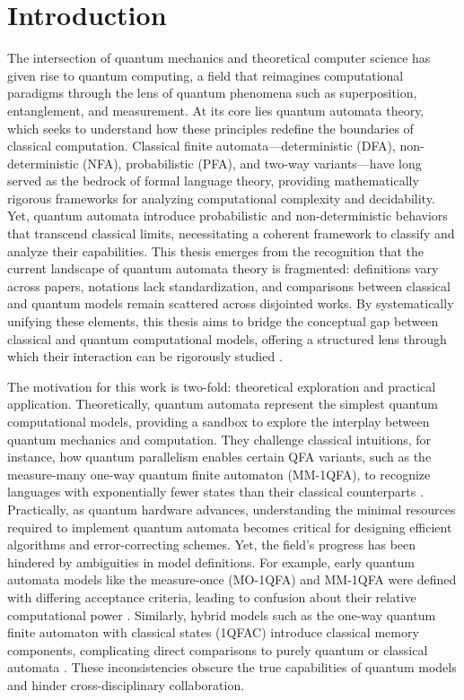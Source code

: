 \chapter{Introduction}  

The intersection of quantum mechanics and theoretical computer science has given rise to quantum computing, a field that reimagines computational paradigms through the lens of quantum phenomena such as superposition, entanglement, and measurement. At its core lies quantum automata theory, which seeks to understand how these principles redefine the boundaries of classical computation. Classical finite automata—deterministic (DFA), non-deterministic (NFA), probabilistic (PFA), and two-way variants—have long served as the bedrock of formal language theory, providing mathematically rigorous frameworks for analyzing computational complexity and decidability. Yet, quantum automata introduce probabilistic and non-deterministic behaviors that transcend classical limits, necessitating a coherent framework to classify and analyze their capabilities. This thesis emerges from the recognition that the current landscape of quantum automata theory is fragmented: definitions vary across papers, notations lack standardization, and comparisons between classical and quantum models remain scattered across disjointed works. By systematically unifying these elements, this thesis aims to bridge the conceptual gap between classical and quantum computational models, offering a structured lens through which their interaction can be rigorously studied \cite{ambainis2009superiority}.  

The motivation for this work is two-fold: theoretical exploration and practical application. Theoretically, quantum automata represent the simplest quantum computational models, providing a sandbox to explore the interplay between quantum mechanics and computation. They challenge classical intuitions, for instance, how quantum parallelism enables certain QFA variants, such as the measure-many one-way quantum finite automaton (MM-1QFA), to recognize languages with exponentially fewer states than their classical counterparts \cite{moore2000quantum}. Practically, as quantum hardware advances, understanding the minimal resources required to implement quantum automata becomes critical for designing efficient algorithms and error-correcting schemes. Yet, the field’s progress has been hindered by ambiguities in model definitions. For example, early quantum automata models like the measure-once (MO-1QFA) and MM-1QFA were defined with differing acceptance criteria, leading to confusion about their relative computational power \cite{kondacs1997power}. Similarly, hybrid models such as the one-way quantum finite automaton with classical states (1QFAC) introduce classical memory components, complicating direct comparisons to purely quantum or classical automata \cite{zheng2012one}. These inconsistencies obscure the true capabilities of quantum models and hinder cross-disciplinary collaboration.  

